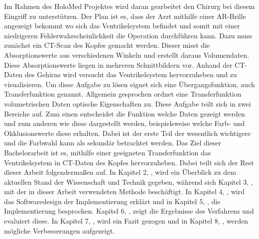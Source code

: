 Im Rahmen des HoloMed Projektes wird daran gearbeitet den Chirurg bei diesem Eingriff zu unterstützen. Der Plan ist es, dass der Arzt mithilfe einer AR-Brille angezeigt bekommt wo sich das Ventrikelsystem befindet und somit mit einer niedrigeren Fehlerwahrscheinlichkeit die Operation durchführen kann.
\newline
Dazu muss zunächst ein CT-Scan des Kopfes gemacht werden. Dieser misst die Absorptionswerte aus verschiedenen Winkeln und erstellt daraus Volumendaten. Diese Absorptionswerte liegen in mehreren Schnittbildern vor.
\newline
Anhand der CT-Daten des Gehirns wird versucht das Ventrikelsystem hervorzuheben und zu visualisieren. Um diese Aufgabe zu lösen eignet sich eine Übergangsfunktion, auch Transferfunktion genannt.
\newline
Allgemein gesprochen ordnet eine Transferfunktion volumetrischen Daten optische Eigenschaften zu. Diese Aufgabe teilt sich in zwei Bereiche auf. Zum einen entscheidet die Funktion welche Daten gezeigt werden und zum anderen wie diese dargestellt werden, beispielsweise welche Farb- und Okklusionswerte diese erhalten. Dabei ist der erste Teil der wesentlich wichtigere und die Farbwahl kann als sekundär betrachtet werden.
\newline
Das Ziel dieser Bachelorarbeit ist es, mithilfe einer geeigneten Transferfunktion das Ventrikelsystem in CT-Daten des Kopfes hervorzuheben.
\newline
Dabei teilt sich der Rest dieser Arbeit folgendermaßen auf. In Kapitel 2, , wird ein Überblick zu dem aktuellen Stand der Wissenschaft und Technik gegeben, während sich Kapitel 3, , mit der in dieser Arbeit verwendeten Methode beschäftigt. In Kapitel 4, , wird das Softwaredesign der Implementierung erklärt und in Kapitel 5, , die Implementierung besprochen. Kapitel 6, , zeigt die Ergebnisse des Verfahrens und evaluiert diese. In Kapitel 7, , wird ein Fazit gezogen und in Kapitel 8, , werden mögliche Verbesserungen aufgezeigt.